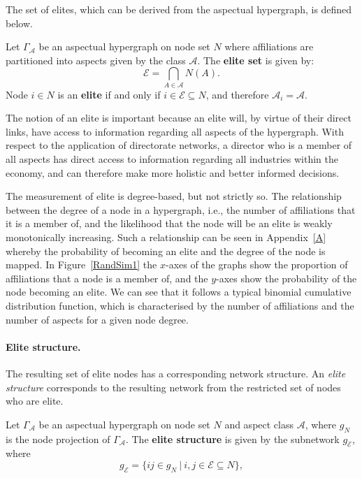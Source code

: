 The set of elites, which can be derived from the aspectual hypergraph, is defined below.
\begin{definition}
Let $\Gamma_{\mathcal{A}}$ be an aspectual hypergraph on node set $N$ where affiliations are partitioned into aspects given by the class $\mathcal{A}$. The \textbf{elite set} is given by:
\begin{equation}
\mathcal{E} = \bigcap_{A \in \mathcal{A}} N(A) .
\end{equation}
Node $i \in N$ is an \textbf{elite} if and only if $i \in \mathcal{E} \subseteq N$, and therefore $\mathcal{A}_{i} = \mathcal{A}$.
\end{definition}
The notion of an elite is important because an elite will, by virtue of their direct links, have access to information regarding all aspects of the hypergraph. With respect to the application of directorate networks, a director who is a member of all aspects has direct access to information regarding all industries within the economy, and can therefore make more holistic and better informed decisions.

The measurement of elite is degree-based, but not strictly so. The relationship between the degree of a node in a hypergraph, i.e., the number of affiliations that it is a member of, and the likelihood that the node will be an elite is weakly monotonically increasing. Such a relationship can be seen in Appendix~\ref{A} whereby the probability of becoming an elite and the degree of the node is mapped. In Figure~\ref{RandSim1} the $x$-axes of the graphs show the proportion of affiliations that a node is a member of, and the $y$-axes show the probability of the node becoming an elite. We can see that it follows a typical binomial cumulative distribution function, which is characterised by the number of affiliations and the number of aspects for a given node degree.

\paragraph{Elite structure.}

The resulting set of elite nodes has a corresponding network structure. An \emph{elite structure} corresponds to the resulting network from the restricted set of nodes who are elite.

\begin{definition}
Let $\Gamma_{\mathcal{A}}$ be an aspectual hypergraph on node set $N$ and aspect class $\mathcal{A}$, where $g_{N}$ is the node projection of $\Gamma_{\mathcal{A}}$. The \textbf{elite structure} is given by the subnetwork $g_{\mathcal{E}}$, where
\begin{equation}
g_{\mathcal{E}} = \{ ij \in g_{N} ~ | ~ i,j \in \mathcal{E} \subseteq N \},
\end{equation}
\end{definition}

